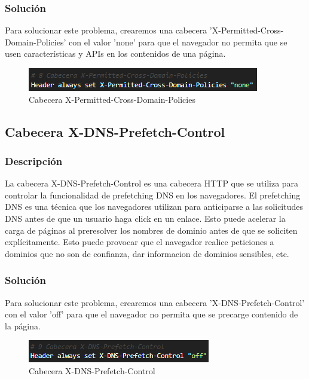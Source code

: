 \documentclass{report}
\begin{document}
                \subsubsection{Solución}
                    Para solucionar este problema, crearemos una cabecera 'X-Permitted-Cross-Domain-Policies' con el valor 'none' para que el navegador no permita que se usen características y APIs en los contenidos de una página.
                    \begin{figure}[H]
                        \centering
                        \includegraphics[width=\textwidth]{./img/vulnerabilidades/3.5/8.1.png}
                        \caption{Cabecera X-Permitted-Cross-Domain-Policies}
                    \end{figure}
            \clearpage
            \subsection{Cabecera X-DNS-Prefetch-Control}
                \subsubsection{Descripción}
                    La cabecera X-DNS-Prefetch-Control es una cabecera HTTP que se utiliza para controlar la funcionalidad de prefetching DNS en los navegadores. El prefetching DNS es una técnica que los navegadores utilizan para anticiparse a las solicitudes DNS antes de que un usuario haga click en un enlace. Esto puede acelerar la carga de páginas al preresolver los nombres de dominio antes de que se soliciten explícitamente.
                    Esto puede provocar que el navegador realice peticiones a dominios que no son de confianza, dar informacion de dominios sensibles, etc.
                \subsubsection{Solución}
                    Para solucionar este problema, crearemos una cabecera 'X-DNS-Prefetch-Control' con el valor 'off' para que el navegador no permita que se precarge contenido de la página.
                    \begin{figure}[H]
                        \centering
                        \includegraphics[width=\textwidth]{./img/vulnerabilidades/3.5/9.1.png}
                        \caption{Cabecera X-DNS-Prefetch-Control}
                    \end{figure}
            \clearpage
\end{document}
